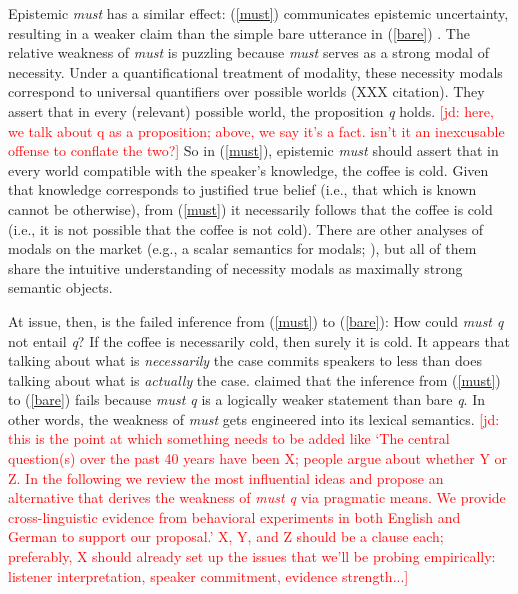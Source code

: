 \documentclass[11pt]{article}
\newcommand{\jd}[1]{\textcolor{Red}{[jd: #1]}}
\begin{document}
Epistemic \emph{must} has a similar effect: (\ref{must}) communicates epistemic uncertainty, resulting in a weaker claim than the simple bare utterance in (\ref{bare}) \citep{karttunen1972}. The relative weakness of \emph{must} is puzzling because \emph{must} serves as a strong modal of necessity. Under a quantificational treatment of modality, these necessity modals correspond to universal quantifiers over possible worlds (XXX citation). They assert that in every (relevant) possible world, the proposition \emph{q} holds. \jd{here, we talk about q as a proposition; above, we say it's a fact. isn't it an inexcusable offense to conflate the two?} So in (\ref{must}), epistemic \emph{must} should assert that in every world compatible with the speaker's knowledge, the coffee is cold. Given that knowledge corresponds to justified true belief (i.e., that which is known cannot be otherwise), from (\ref{must}) it necessarily follows that the coffee is cold (i.e., it is not possible that the coffee is not cold). There are other analyses of modals on the market (e.g., a scalar semantics for modals; \citealp{lassiter2011}), but all of them share the intuitive understanding of necessity modals as maximally strong semantic objects.

At issue, then, is the failed inference from (\ref{must}) to (\ref{bare}): How could \emph{must q} not entail \emph{q}? If the coffee is necessarily cold, then surely it is cold. It appears that talking about what is \emph{necessarily} the case commits speakers to less than does talking about what is \emph{actually} the case. \cite{karttunen1972} claimed that the inference from (\ref{must}) to (\ref{bare}) fails because \emph{must q} is a logically weaker statement than bare \emph{q}. In other words, the weakness of \emph{must} gets engineered into its lexical semantics. \jd{this is the point at which something needs to be added like `The central question(s) over the past 40 years have been X; people argue about whether Y or Z. In the following we review the most influential ideas and propose an alternative that derives the weakness of \emph{must q} via pragmatic means. We provide cross-linguistic evidence from behavioral experiments in both English and German to support our proposal.' X, Y, and Z should be a clause each; preferably, X should already set up the issues that we'll be probing empirically: listener interpretation, speaker commitment, evidence strength...}
\end{document}
